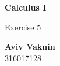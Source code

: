 \documentclass[a4paper, 12pt]{article}
\begin{document}
    \begin{center}
        \vspace*{4.4cm}
            
        \Huge
        \textbf{Calculus I}
            
        \vspace{0.5cm}
        \LARGE
        Exercise 5

        \vfill
            
        \Large
        \textbf{Aviv Vaknin}\\316017128
                    
    \end{center}
\end{document}
